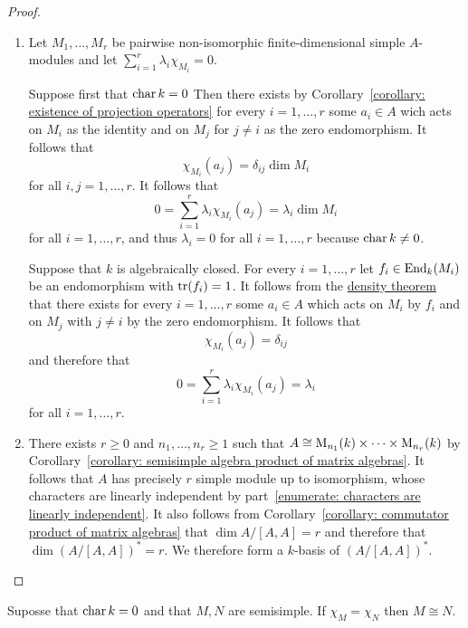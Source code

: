 \begin{proof}
  \leavevmode
  \begin{enumerate}
    \item
      Let $M_1, \dotsc, M_r$ be pairwise non-isomorphic finite-dimensional simple $A$-modules and let $\sum_{i=1}^r \lambda_i \chi_{M_i} = 0$.
      
      Suppose first that $\operatorname{char} k = 0$
      Then there exists by Corollary~\ref{corollary: existence of projection operators} for every $i = 1, \dotsc, r$ some $a_i \in A$ wich acts on $M_i$ as the identity and on $M_j$ for $j \neq i$ as the zero endomorphism.
      It follows that
      \[
          \chi_{M_i}(a_j)
        = \delta_{ij} \dim M_i
      \]
      for all $i, j = 1, \dotsc, r$.
      It follows that
      \[
          0
        = \sum_{i=1}^r \lambda_i \chi_{M_i}(a_j)
        = \lambda_i \dim M_i
      \]
      for all $i = 1, \dotsc, r$, and thus $\lambda_i = 0$ for all $i = 1, \dotsc, r$ because $\operatorname{char} k \neq 0$.
      
      Suppose that $k$ is algebraically closed.
      For every $i = 1, \dotsc, r$ let $f_i \in \operatorname{End}_k(M_i)$ be an endomorphism with $\operatorname{tr}(f_i) = 1$.
      It follows from the \hyperref[theorem: density theorem]{density theorem} that there exists for every $i = 1, \dotsc, r$ some $a_i \in A$ which acts on $M_i$ by $f_i$ and on $M_j$ with $j \neq i$ by the zero endomorphism.
      It follows that
      \[
          \chi_{M_i}(a_j)
        = \delta_{ij}
      \]
      and therefore that
      \[
          0
        = \sum_{i=1}^r \lambda_i \chi_{M_i}(a_j)
        = \lambda_i
      \]
      for all $i = 1, \dotsc, r$.
    \item
      There exists $r \geq 0$ and $n_1, \dotsc, n_r \geq 1$ such that $A \cong \operatorname{M}_{n_1}(k) \times \dotsb \times \operatorname{M}_{n_r}(k)$ by Corollary~\ref{corollary: semisimple algebra product of matrix algebras}.
      It follows that $A$ has precisely $r$ simple module up to isomorphism, whose characters are linearly independent by part~\ref*{enumerate: characters are linearly independent}.
      It also follows from Corollary~\ref{corollary: commutator product of matrix algebras} that $\dim A/[A,A] = r$ and therefore that $\dim (A/[A,A])^* = r$.
      We therefore form a $k$-basis of $(A/[A,A])^*$.
    \qedhere
  \end{enumerate}
\end{proof}


\begin{corollary}
  Suposse that $\operatorname{char} k = 0$ and that $M, N$ are semisimple.
  If $\chi_M = \chi_N$ then $M \cong N$.
\end{corollary}


